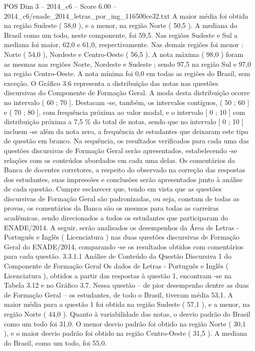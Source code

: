 \begin{textsample}{POS Dim 3 – 2014\_c6 – Score 6.00 – 2014\_c6/enade\_2014\_letras\_por\_ing\_116500ce32.txt}
A maior média foi obtida na região Sudeste ( 58,0 ), e a menor, na região Norte ( 50,5 ).
A mediana do Brasil como um todo, neste componente, foi 59,5.
Nas regiões Sudeste e Sul a mediana foi maior, 62,0 e 61,0, respectivamente.
Nas demais regiões foi menor : Norte ( 54,0 ), Nordeste e Centro-Oeste ( 56,5 ).
A nota máxima ( 98,0 ) foram as mesmas nas regiões Norte, Nordeste e Sudeste ; sendo 97,5 na região Sul e 97,0 na região Centro-Oeste.
A nota mínima foi 0,0 em todas as regiões do Brasil, sem exceção.
O Gráfico 3.6 representa a distribuição das notas nas questões discursivas do Componente de Formação Geral.
A moda desta distribuição ocorre no intervalo ( 60 ; 70 ].
Destacam -se, também, os intervalos contíguos, ( 50 ; 60 ] e ( 70 ; 80 ], com frequência próxima ao valor modal, e o intervalo [ 0 ; 10 ] com distribuição próxima a 7,5 \% do total de notas, sendo que no intervalo [ 0 ; 10 ] incluem -se além da nota zero, a frequência de estudantes que deixaram este tipo de questão em branco.
Na sequência, os resultados verificados para cada uma das questões discursivas de Formação Geral serão apresentados, estabelecendo -se relações com os conteúdos abordados em cada uma delas.
Os comentários da Banca de docentes corretores, a respeito do observado na correção das respostas dos estudantes, suas impressões e conclusões serão apresentados junto à análise de cada questão.
Cumpre esclarecer que, tendo em vista que as questões discursivas de Formação Geral são padronizadas, ou seja, constam de todas as provas, os comentários da Banca são os mesmos para todas as carreiras acadêmicas, sendo direcionados a todos os estudantes que participaram do ENADE/2014.
A seguir, serão analisados os desempenhos da Área de Letras - Português e Inglês ( Licenciatura ) nas duas questões discursivas de Formação Geral do ENADE/2014, comparando -se os resultados obtidos com comentários para cada questão. 3.3.1.1 Análise de Conteúdo da Questão Discursiva 1 do Componente de Formação Geral Os dados de Letras - Português e Inglês ( Licenciatura ), obtidos a partir das respostas à questão 1, encontram -se na Tabela 3.12 e no Gráfico 3.7.
Nessa questão – de pior desempenho dentre as duas de Formação Geral – os estudantes, de todo o Brasil, tiveram média 53,1.
A maior média para a questão 1 foi obtida na região Sudeste ( 57,1 ), e a menor, na região Norte ( 44,0 ).
Quanto à variabilidade das notas, o desvio padrão do Brasil como um todo foi 31,0.
O menor desvio padrão foi obtido na região Norte ( 30,1 ), e o maior desvio padrão foi obtido na região Centro-Oeste ( 31,5 ).
A mediana do Brasil, como um todo, foi 55,0.

\end{textsample}
